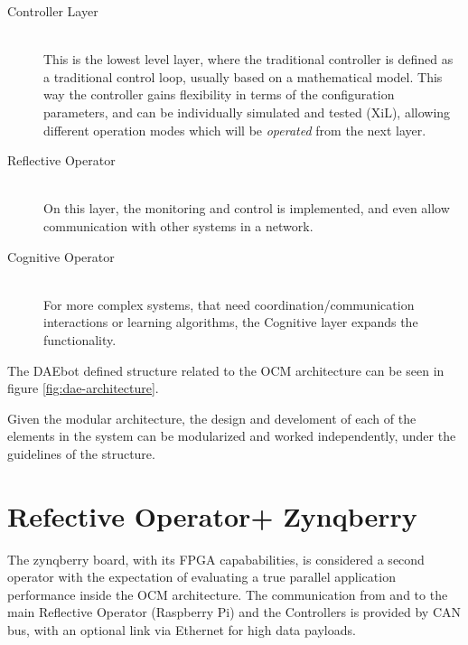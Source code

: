 \begin{description}
	\item[Controller Layer] \hfill \\ This is the lowest level layer, where the traditional controller is defined as a traditional control loop, usually based on a mathematical model. This way the controller gains flexibility in terms of the configuration parameters, and can be individually simulated and tested (XiL), allowing different operation modes which will be \textit{operated} from the next layer.
	\item[Reflective Operator] \hfill \\ On this layer, the monitoring and control is implemented, and even allow communication with other systems in a network.
	\item[Cognitive Operator] \hfill \\ For more complex systems, that need coordination/communication interactions or learning algorithms, the Cognitive layer expands the functionality.
\end{description}

The DAEbot defined structure related to the OCM architecture can be seen in figure \ref{fig:dae-architecture}.

Given the modular architecture, the design and develoment of each of the elements in the system can be modularized and worked independently, under the guidelines of the structure.

\section{Refective Operator+ Zynqberry}

The zynqberry board, with its FPGA capababilities, is considered a second operator with the expectation of evaluating a true parallel application performance inside the OCM architecture. The communication from and to the main Reflective Operator (Raspberry Pi) and the Controllers is provided by CAN bus, with an optional link via Ethernet for high data payloads.
